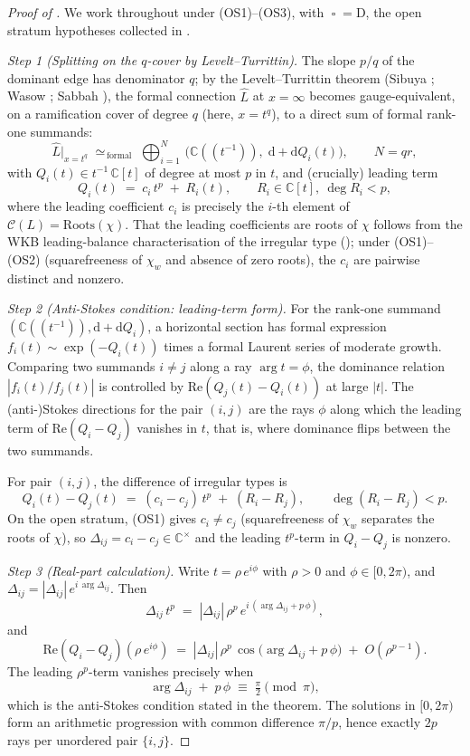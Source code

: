\documentclass[aip,jmp,preprint,amsmath,amssymb,nofootinbib,floatfix]{revtex4-2}
\theoremstyle{plain}
\theoremstyle{definition}
\theoremstyle{remark}
\newcommand{\op}{\mathop{\square}}                %
\newcommand{\opD}{\mathrm{D}}                     %
\newcommand{\Roots}{\mathrm{Roots}}
\newcommand{\Cl}{\mathcal{C}}
\newcommand{\Dij}{\Delta_{ij}}
\DeclareMathOperator{\arginline}{arg}
\begin{document}
\begin{proof}[Proof of ]
We work throughout under (OS1)--(OS3), with $\op = \opD$, the open
stratum hypotheses collected in .

\smallskip
\textit{Step 1 (Splitting on the $q$-cover by Levelt--Turrittin).}
The slope $p/q$ of the dominant edge has denominator $q$; by the
Levelt--Turrittin theorem (Sibuya \cite{sibuya}; Wasow
\cite[Ch.~VII, Thms.~19.1, 19.2]{wasow}; Sabbah
\cite[Ch.~II, Thm.~II.2.4]{sabbah-isomon}), the formal connection
$\widehat{L}$ at $x = \infty$ becomes gauge-equivalent, on a
ramification cover of degree $q$ (here, $x = t^q$), to a direct sum
of formal rank-one summands:
\[
   \widehat{L}\big|_{x = t^q}
   \;\simeq_{\,\mathrm{formal}}\;
   \bigoplus_{i = 1}^{N}\,
   \big(\mathbb{C}((t^{-1})),\; \mathrm{d} + \mathrm{d} Q_i(t)\big),
   \qquad N = qr,
\]
with $Q_i(t) \in t^{-1}\, \mathbb{C}[t]$ of degree at most $p$ in $t$,
and (crucially) leading term
\[
   Q_i(t) \;=\; c_i\, t^p \;+\; R_i(t),
   \qquad
   R_i \in \mathbb{C}[t],\ \deg R_i < p,
\]
where the leading coefficient $c_i$ is precisely the $i$-th element
of $\Cl(L) = \Roots(\chi)$. That the leading coefficients are roots
of $\chi$ follows from the WKB leading-balance characterisation of
the irregular type (\cite[Ch.~II, \S 1.3]{sabbah-isomon}); under
(OS1)--(OS2) (squarefreeness of $\chi_w$ and absence of zero roots),
the $c_i$ are pairwise distinct and nonzero.

\smallskip
\textit{Step 2 (Anti-Stokes condition: leading-term form).}
For the rank-one summand $(\mathbb{C}((t^{-1})), \mathrm{d} +
\mathrm{d} Q_i)$, a horizontal section has formal expression
$f_i(t) \sim \exp(-Q_i(t))$ times a formal Laurent series of moderate
growth. Comparing two summands $i \ne j$ along a ray $\arg t = \phi$,
the dominance relation $|f_i(t)/f_j(t)|$ is controlled by
$\mathrm{Re}(Q_j(t) - Q_i(t))$ at large $|t|$. The (anti-)Stokes
directions for the pair $(i, j)$ are the rays $\phi$ along which the
leading term of $\mathrm{Re}(Q_i - Q_j)$ vanishes in $t$, that is,
where dominance flips between the two summands.

For pair $(i, j)$, the difference of irregular types is
\[
   Q_i(t) - Q_j(t) \;=\; (c_i - c_j)\, t^p \;+\; (R_i - R_j),
   \qquad \deg(R_i - R_j) < p.
\]
On the open stratum, (OS1) gives $c_i \ne c_j$ (squarefreeness of
$\chi_w$ separates the roots of $\chi$), so $\Dij = c_i - c_j \in
\mathbb{C}^\times$ and the leading $t^p$-term in $Q_i - Q_j$ is
nonzero.

\smallskip
\textit{Step 3 (Real-part calculation).}
Write $t = \rho\, e^{i\phi}$ with $\rho > 0$ and $\phi \in
[0, 2\pi)$, and $\Dij = |\Dij|\, e^{i\, \arginline \Dij}$. Then
\[
   \Dij\, t^p \;=\; |\Dij|\, \rho^p\, e^{i\, (\arginline \Dij + p\, \phi)},
\]
and
\[
   \mathrm{Re}(Q_i - Q_j)(\rho\, e^{i\phi})
   \;=\;
   |\Dij|\, \rho^p\, \cos\!\big(\arginline \Dij + p\, \phi\big)
   \;+\; O(\rho^{p-1}).
\]
The leading $\rho^p$-term vanishes precisely when
\[
   \arginline \Dij \;+\; p\, \phi \;\equiv\;
   \tfrac{\pi}{2} \pmod{\pi},
\]
which is the anti-Stokes condition stated in the theorem. The
solutions in $[0, 2\pi)$ form an arithmetic progression with
common difference $\pi / p$, hence exactly $2p$ rays per
unordered pair $\{i, j\}$.


\end{proof}
\end{document}
